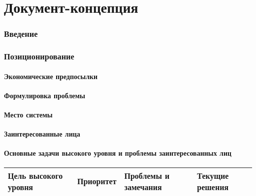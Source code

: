 \documentclass[a4paper, 14pt]{extarticle}
\begin{document}
\section{Документ-концепция}

\subsubsection*{Введение}


\subsubsection*{Позиционирование}

\paragraph*{Экономические предпосылки}


\paragraph*{Формулировка проблемы}


\paragraph*{Место системы}


\paragraph*{Заинтересованные лица}


\paragraph*{Основные задачи высокого уровня и проблемы заинтересованных лиц}


\begin{longtable}{|L{0.225\textwidth}|L{0.225\textwidth}|L{0.225\textwidth}|L{0.225\textwidth}|}
  \hline
  \textbf{Цель высокого уровня} & \textbf{Приоритет} & \textbf{Проблемы и замечания} & \textbf{Текущие решения} \\
  \hline
\end{longtable}
\end{document}
